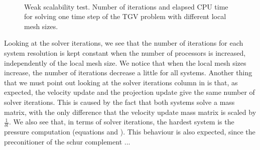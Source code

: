 \begin{figure}[p]
  \\
  \caption{Weak scalability test. Number of iterations and elapsed CPU time for solving one time step of the TGV problem with different local mesh sizes.}
  \label{fig-TGV_SRK_scal}
\end{figure}

Looking at the solver iterations, we see that the number of iterations for each system resolution is kept constant when the number of processors is increased, independently of the local mesh size. We notice that when the local mesh sizes increase, the number of iterations decrease a little for all systems. Another thing that we must point out looking at the solver iterations column in  is that, as expected, the velocity update and the projection update give the same number of solver iterations. This is caused by the fact that both systems solve a mass matrix, with the only difference that the velocity update mass matrix is scaled by $ \frac{1}{\delta t} $. We also see that, in terms of solver iterations, the hardest system is the pressure computation (equations  and ). This behaviour is also expected, since the preconitioner of the schur complement ...

